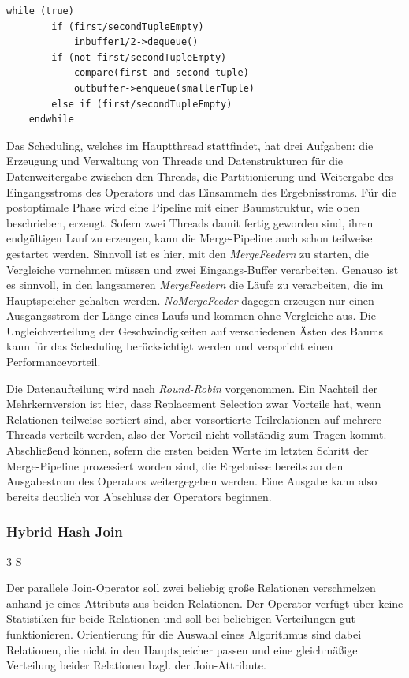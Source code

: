 \documentclass[a4paper,12pt,twoside]{article}
\newcommand{\Fb}[1]{\textit{#1}} %
\begin{document}
\begin{minipage}{\linewidth}
	\begin{lstlisting}[caption={Fastsort: Merge in Pipeline}, label=list:fastsortMerge] 
	while (true)
		if (first/secondTupleEmpty)
			inbuffer1/2->dequeue()
		if (not first/secondTupleEmpty)
			compare(first and second tuple)
			outbuffer->enqueue(smallerTuple)
		else if (first/secondTupleEmpty)
	endwhile
	\end{lstlisting}
\end{minipage}

Das Scheduling, welches im Hauptthread stattfindet, hat drei Aufgaben: die Erzeugung und Verwaltung von Threads und Datenstrukturen für die Datenweitergabe zwischen den Threads, die Partitionierung und Weitergabe des Eingangsstroms des Operators und das Einsammeln des Ergebnisstroms. Für die postoptimale Phase wird eine Pipeline mit einer Baumstruktur, wie oben beschrieben, erzeugt. Sofern zwei Threads damit fertig geworden sind, ihren endgültigen Lauf zu erzeugen, kann die Merge-Pipeline auch schon teilweise gestartet werden. Sinnvoll ist es hier, mit den \Fb{MergeFeedern} zu starten, die Vergleiche vornehmen müssen und zwei Eingangs-Buffer verarbeiten. Genauso ist es sinnvoll, in den langsameren \Fb{MergeFeedern} die Läufe zu verarbeiten, die im Hauptspeicher gehalten werden. \Fb{NoMergeFeeder} dagegen erzeugen nur einen Ausgangsstrom der Länge eines Laufs und kommen ohne Vergleiche aus. Die Ungleichverteilung der Geschwindigkeiten auf verschiedenen Ästen des Baums kann für das Scheduling berücksichtigt werden und verspricht einen Performancevorteil.

Die Datenaufteilung wird nach \Fb{Round-Robin} vorgenommen. Ein Nachteil der Mehrkernversion ist hier, dass Replacement Selection zwar Vorteile hat, wenn Relationen teilweise sortiert sind, aber vorsortierte Teilrelationen auf mehrere Threads verteilt werden, also der Vorteil nicht vollständig zum Tragen kommt. Abschließend können, sofern die ersten beiden Werte im letzten Schritt der Merge-Pipeline prozessiert worden sind, die Ergebnisse bereits an den Ausgabestrom des Operators weitergegeben werden. Eine Ausgabe kann also bereits deutlich vor Abschluss der Operators beginnen.

\subsubsection{Hybrid Hash Join} 3 S
\label{entw:hash}

Der parallele Join-Operator soll zwei beliebig große Relationen verschmelzen anhand je eines Attributs aus beiden Relationen. Der Operator verfügt über keine Statistiken für beide Relationen und soll bei beliebigen Verteilungen gut funktionieren. Orientierung für die Auswahl eines Algorithmus sind dabei Relationen, die nicht in den Hauptspeicher passen und eine gleichmäßige Verteilung beider Relationen bzgl. der Join-Attribute.
\end{document}
